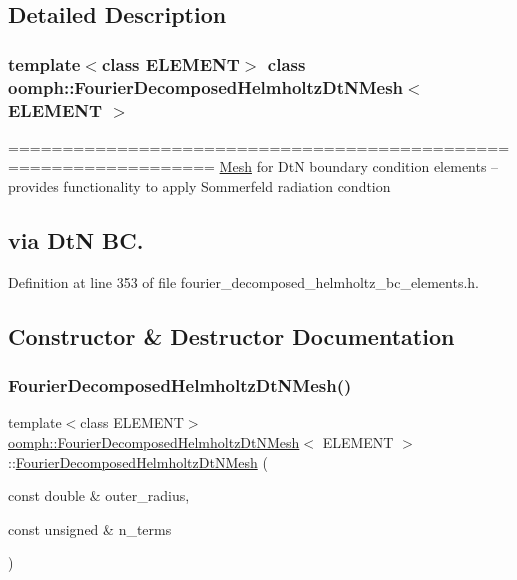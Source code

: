 \subsection{Detailed Description}
\subsubsection*{template$<$class E\+L\+E\+M\+E\+NT$>$\newline
class oomph\+::\+Fourier\+Decomposed\+Helmholtz\+Dt\+N\+Mesh$<$ E\+L\+E\+M\+E\+N\+T $>$}

================================================================= \hyperlink{classoomph_1_1Mesh}{Mesh} for DtN boundary condition elements -- provides functionality to apply Sommerfeld radiation condtion \subsection*{via DtN BC. }

Definition at line 353 of file fourier\+\_\+decomposed\+\_\+helmholtz\+\_\+bc\+\_\+elements.\+h.



\subsection{Constructor \& Destructor Documentation}
\mbox{\label{classoomph_1_1FourierDecomposedHelmholtzDtNMesh_a572d987fdb38434f87aac2e049e905bb}} 
\subsubsection{\texorpdfstring{Fourier\+Decomposed\+Helmholtz\+Dt\+N\+Mesh()}{FourierDecomposedHelmholtzDtNMesh()}}
{\footnotesize\ttfamily template$<$class E\+L\+E\+M\+E\+NT$>$ \\
\hyperlink{classoomph_1_1FourierDecomposedHelmholtzDtNMesh}{oomph\+::\+Fourier\+Decomposed\+Helmholtz\+Dt\+N\+Mesh}$<$ E\+L\+E\+M\+E\+NT $>$\+::\hyperlink{classoomph_1_1FourierDecomposedHelmholtzDtNMesh}{Fourier\+Decomposed\+Helmholtz\+Dt\+N\+Mesh} (\begin{DoxyParamCaption}\item[{const double \&}]{outer\+\_\+radius,  }\item[{const unsigned \&}]{n\+\_\+terms }\end{DoxyParamCaption})\hspace{0.3cm}{\ttfamily [inline]}}

